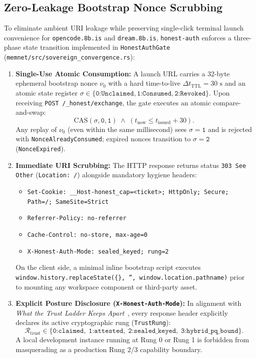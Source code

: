 \documentclass[10pt,twocolumn,letterpaper]{article}
\begin{document}
\subsection{Zero-Leakage Bootstrap Nonce Scrubbing}
To eliminate ambient URI leakage while preserving single-click terminal launch convenience for \texttt{opencode.8b.is} and \texttt{dream.8b.is}, \texttt{honest-auth} enforces a three-phase state transition implemented in \texttt{HonestAuthGate} (\texttt{memnet/src/sovereign\_convergence.rs}):
\begin{enumerate}[leftmargin=1.4em,itemsep=1pt,topsep=2pt]
    \item \textbf{Single-Use Atomic Consumption:} A launch URL carries a 32-byte ephemeral bootstrap nonce $\nu_0$ with a hard time-to-live $\Delta t_{\text{TTL}} = 30\text{ s}$ and an atomic state register $\sigma \in \{\texttt{0:Unclaimed}, \texttt{1:Consumed}, \texttt{2:Revoked}\}$. Upon receiving \texttt{POST /\_honest/exchange}, the gate executes an atomic compare-and-swap:
    \begin{equation}
        \text{CAS}(\sigma, \texttt{0}, \texttt{1}) \;\wedge\; (t_{\text{now}} \le t_{\text{issued}} + 30).
    \end{equation}
    Any replay of $\nu_0$ (even within the same millisecond) sees $\sigma=\texttt{1}$ and is rejected with \texttt{NonceAlreadyConsumed}; expired nonces transition to $\sigma=\texttt{2}$ (\texttt{NonceExpired}).
    \item \textbf{Immediate URI Scrubbing:} The HTTP response returns status \texttt{303 See Other} (\texttt{Location: /}) alongside mandatory hygiene headers:
    \begin{itemize}[leftmargin=1.2em,itemsep=0pt,topsep=1pt]
        \item \texttt{Set-Cookie: \_\_Host-honest\_cap=<ticket>; HttpOnly; Secure; Path=/; SameSite=Strict}
        \item \texttt{Referrer-Policy: no-referrer}
        \item \texttt{Cache-Control: no-store, max-age=0}
        \item \texttt{X-Honest-Auth-Mode: sealed\_keyed; rung=2}
    \end{itemize}
    On the client side, a minimal inline bootstrap script executes \texttt{window.history.replaceState(\{\}, '', window.location.pathname)} prior to mounting any workspace component or third-party asset.
    \item \textbf{Explicit Posture Disclosure (\texttt{X-Honest-Auth-Mode}):} In alignment with \emph{What the Trust Ladder Keeps Apart}~\cite{guimond2026trustladder}, every response header explicitly declares its active cryptographic rung (\texttt{TrustRung}):
    \begin{equation}
        \mathcal{R}_{\text{trust}} \in \bigl\{\texttt{0:claimed},\; \texttt{1:attested},\; \texttt{2:sealed\_keyed},\; \texttt{3:hybrid\_pq\_bound}\bigr\}.
    \end{equation}
    A local development instance running at Rung 0 or Rung 1 is forbidden from masquerading as a production Rung 2/3 capability boundary.
\end{enumerate}
\end{document}
